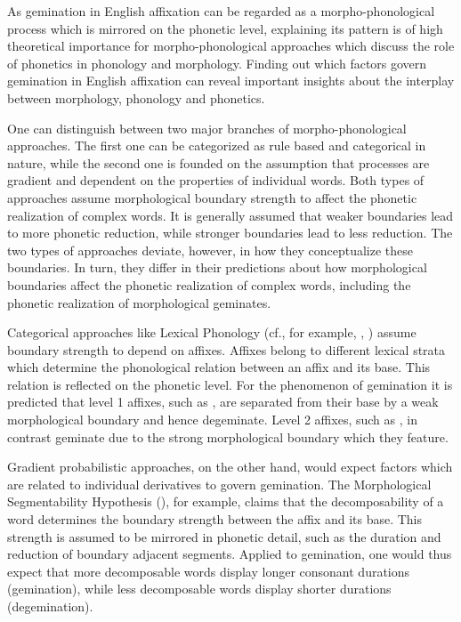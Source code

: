 As gemination in English affixation can be regarded as a morpho-phonological process which is mirrored on the phonetic level, explaining its pattern is of high theoretical importance for morpho-phonological approaches which discuss the role of phonetics in phonology and morphology. Finding out which factors govern gemination in English affixation can reveal important insights about the interplay between morphology, phonology and phonetics.

One can distinguish between two major branches of morpho-phonological approaches. The first one can be categorized as rule based and  categorical in nature, while the second one is founded on the assumption that processes are gradient and dependent on the properties of individual words. 
Both types of approaches assume morphological boundary strength to affect the phonetic realization of complex words. 
It is generally assumed that weaker boundaries lead to more phonetic reduction, while stronger boundaries lead to less reduction. 
The two types of approaches deviate, however, in how they conceptualize these boundaries. In turn, they differ in their predictions about how morphological boundaries affect the phonetic realization of complex words, including the phonetic realization of morphological geminates.
 

Categorical approaches like Lexical Phonology (cf., for example, \citealt{Kiparsky.1982}, \citealt{Mohanan.1986}) assume boundary strength to depend on affixes. Affixes belong to different lexical strata which determine the phonological relation between an affix and its base. This relation is reflected on the phonetic level. 
For the phenomenon of gemination it is predicted that level 1 affixes, such as , are separated from their base by a weak morphological boundary and hence degeminate. Level 2 affixes, such as , in contrast geminate due to the strong morphological boundary which they feature. 

Gradient probabilistic approaches, on the other hand, would expect factors which are related to individual derivatives to govern gemination. The Morphological Segmentability Hypothesis (\citealt{Hay.2003}), for example, claims that the decomposability of a word determines the boundary strength between the affix and its base. This strength is assumed to be mirrored in phonetic detail, such as the duration and reduction of boundary adjacent segments. Applied to gemination, one would thus expect that more decomposable words display longer consonant durations (gemination), while less decomposable words display shorter durations (degemination). 


